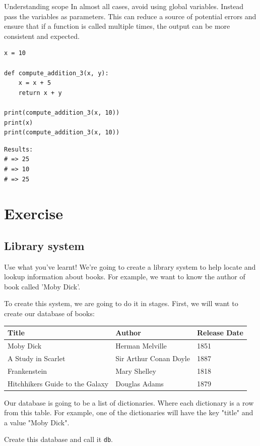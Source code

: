 \documentclass[10pt]{beamer}
\begin{document}
\begin{frame}[label={sec:orgedc3cc3},fragile]{Understanding scope}
 In almost all cases, avoid using global variables. Instead pass the variables as
parameters. This can reduce a source of potential errors and ensure that if a
function is called multiple times, the output can be more consistent and expected.

\begin{verbatim}
x = 10

def compute_addition_3(x, y):
    x = x + 5
    return x + y

print(compute_addition_3(x, 10))
print(x)
print(compute_addition_3(x, 10))
\end{verbatim}

\begin{verbatim}
Results: 
# => 25
# => 10
# => 25
\end{verbatim}
\end{frame}

\section{Exercise}
\label{sec:orge05dc87}

\subsection{Library system}
\label{sec:org1df80c7}

\begin{frame}[label={sec:org2228403},fragile]{Use what you've learnt!}
 We're going to create a library system to help locate and lookup information about
books. For example, we want to know the author of book called 'Moby Dick'.

To create this system, we are going to do it in stages. First, we will want to create
our database of books:

\begin{center}
\begin{tabularx}{\textwidth}{XXX}
Title & Author & Release Date\\
\hline
Moby Dick & Herman Melville & 1851\\
A Study in Scarlet & Sir Arthur Conan Doyle & 1887\\
Frankenstein & Mary Shelley & 1818\\
Hitchhikers Guide to the Galaxy & Douglas Adams & 1879\\
\end{tabularx}
\end{center}

Our database is going to be a list of dictionaries. Where each dictionary is a row
from this table. For example, one of the dictionaries will have the key "title" and a
value "Moby Dick".

Create this database and call it \texttt{db}.
\end{frame}
\end{document}
